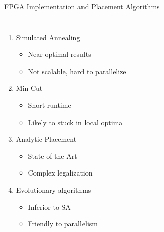 \documentclass[10pt]{beamer}
\begin{document}
\begin{frame}{FPGA Implementation and Placement Algorithms}
\begin{columns}[T, onlytextwidth]
      \begin{enumerate}
        \item Simulated Annealing
        \begin{itemize}
          \item Near optimal results
          \item Not scalable, hard to parallelize
        \end{itemize}
        \item Min-Cut
        \begin{itemize}
          \item Short runtime
          \item Likely to stuck in local optima
        \end{itemize}
        \item Analytic Placement
        \begin{itemize}
          \item State-of-the-Art
          \item Complex legalization
        \end{itemize}
        \item Evolutionary algorithms
        \begin{itemize}
          \item Inferior to SA
          \item Friendly to parallelism
        \end{itemize}
      \end{enumerate}

  \end{columns}

\end{frame}
\end{document}
